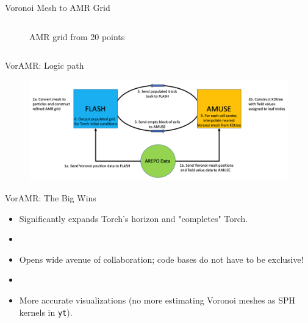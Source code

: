 \documentclass[aspectratio=169]{beamer}
\begin{document}
\begin{frame}{Voronoi Mesh to AMR Grid}
\begin{columns}
\begin{column}{0.37\textwidth}
\begin{figure}[h!]
                \caption{AMR grid from 20 points}
                \label{fig:amr_example}
            \end{figure}
        \end{column}
    \end{columns}
\end{frame} 
%
%
%
%
%
\begin{frame}{VorAMR: Logic path}
	\begin{figure}[h!]
                \centering
                \includegraphics[width=\linewidth]{../images/voramr_logic.png} \\
                \label{fig:voramr_logic}
	\end{figure}
\end{frame}
%
%
%
%
%
\begin{frame}{VorAMR: The Big Wins}{}
    \begin{itemize}
    	\item Significantly expands Torch's horizon and "completes" Torch.
	\item []
    	\item Opens wide avenue of collaboration; code bases do not have to be exclusive! 
	\item []
	\item More accurate visualizations (no more estimating Voronoi meshes as SPH kernels in \texttt{yt}).
    \end{itemize}
\end{frame}
\end{document}
